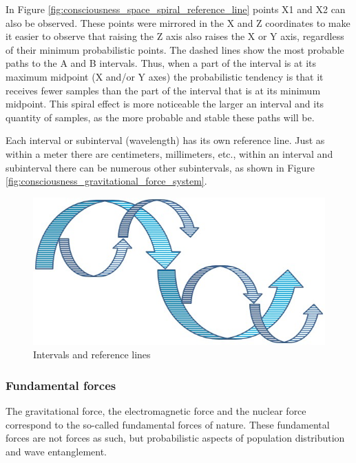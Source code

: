 In Figure \ref{fig:consciousness_space_spiral_reference_line} points X1 and X2 can also be observed. These points were mirrored in the X and Z coordinates to make it easier to observe that raising the Z axis also raises the X or Y axis, regardless of their minimum probabilistic points. The dashed lines show the most probable paths to the A and B intervals. Thus, when a part of the interval is at its maximum midpoint (X and/or Y axes) the probabilistic tendency is that it receives fewer samples than the part of the interval that is at its minimum midpoint. This spiral effect is more noticeable the larger an interval and its quantity of samples, as the more probable and stable these paths will be.

Each interval or subinterval (wavelength) has its own reference line. Just as within a meter there are centimeters, millimeters, etc., within an interval and subinterval there can be numerous other subintervals, as shown in Figure \ref{fig:consciousness_gravitational_force_system}.
	\begin{figure}[H]
	\caption{Intervals and reference lines}
	\label{fig:consciousness_space_spiral_underlines}
	\centering
	\includegraphics[scale=.5]{sections/images/consciousness_space_spiral_underlines.jpg}
	\end{figure}

\subsubsection{Fundamental forces}
The gravitational force, the electromagnetic force and the nuclear force correspond to the so-called fundamental forces of nature. These fundamental forces are not forces as such, but probabilistic aspects of population distribution and wave entanglement.

